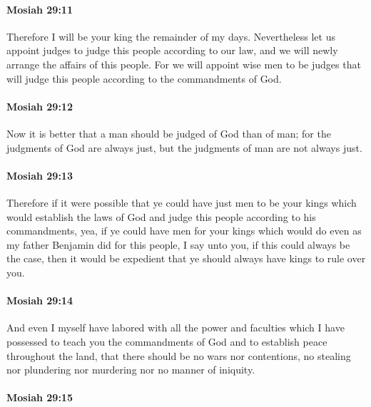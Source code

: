 		\paragraph{Mosiah 29:11} %
			\label{MOSIAH-29-11}

			Therefore I will be your king the remainder of my days.
			Nevertheless let us appoint judges to judge this people according to our law,
			and we will newly arrange the affairs of this people.
			For we will appoint wise men to be judges
			that will judge this people according to the commandments of God.

		\paragraph{Mosiah 29:12} %
			\label{MOSIAH-29-12}

			Now it is better that a man should be judged of God than of man;
			for the judgments of God are always just,
			but the judgments of man are not always just.

		\paragraph{Mosiah 29:13} %
			\label{MOSIAH-29-13}

			Therefore if it were possible that ye could have just men to be your kings
			which would establish the laws of God
			and judge this people according to his commandments,
			yea, if ye could have men for your kings
			which would do even as my father Benjamin did for this people,
			I say unto you,
			if this could always be the case,
			then it would be expedient
			that ye should always have kings to rule over you.

		\paragraph{Mosiah 29:14} %
			\label{MOSIAH-29-14}

			And even I myself have labored
			with all the power and faculties which I have possessed
			to teach you the commandments of God
			and to establish peace throughout the land,
			that there should be no wars nor contentions,
			no stealing nor plundering nor murdering nor no manner of iniquity.

		\paragraph{Mosiah 29:15} %
			\label{MOSIAH-29-15}

